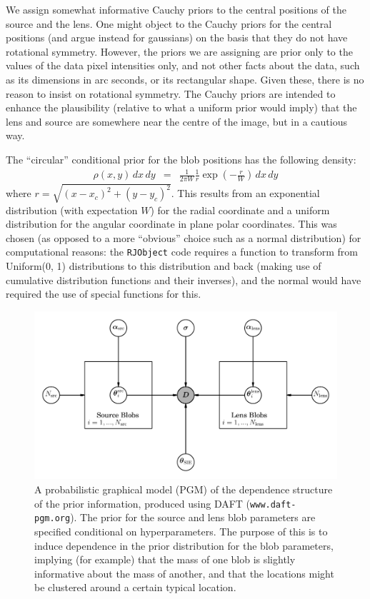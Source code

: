 \documentclass[useAMS,usenatbib]{mn2e}
\begin{document}
We assign somewhat informative Cauchy priors to the central positions of the
source and the lens.
One might object to the Cauchy priors
for the central positions (and argue instead for gaussians) on the
basis that they do not have rotational symmetry. However, the priors we
are assigning are prior only to the values of the data pixel intensities only,
and not other facts about the data, such as its dimensions in arc seconds, or its
rectangular shape. Given these, there is no reason to insist on rotational
symmetry. The Cauchy priors are intended to enhance the plausibility
(relative to what a uniform prior would imply) that the
lens and source are somewhere near the centre of the image, but in a cautious
way.

The ``circular'' conditional prior for the blob positions has the following
density:
\begin{eqnarray}
\rho(x, y)\, dx \, dy &=&
\frac{1}{2\pi W} \frac{1}{r}\exp\left(-\frac{r}{W}\right) \, dx \, dy
\end{eqnarray}
where $r = \sqrt{(x-x_c)^2 + (y-y_c)^2}$. This results from an exponential
distribution (with expectation $W$) for the radial coordinate and a uniform distribution for the angular coordinate in plane polar coordinates. This was
chosen (as opposed to a more ``obvious'' choice such as a normal distribution)
for computational reasons: the {\tt RJObject} code requires a function to
transform from Uniform(0, 1) distributions to this distribution and back
(making use of cumulative distribution functions and their inverses), and
the normal would have required the use of special functions for this.

\begin{figure}
\includegraphics{pgm.pdf}
\caption{A probabilistic graphical model (PGM) of the dependence structure
of the prior information, produced using DAFT ({\tt www.daft-pgm.org}).
The prior for the source and lens blob parameters are specified conditional
on hyperparameters. The purpose of this is to induce dependence in the prior
distribution for the blob parameters, implying (for example) that the mass of
one blob is slightly informative about the mass of another, and that the
locations might be clustered around a certain typical location.
\label{fig:pgm}}
\end{figure}
\end{document}
